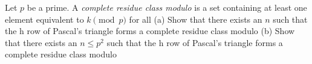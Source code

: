 Let $p$ be a prime. A \textit{complete residue class modulo } is a set containing at least one element equivalent to $k \pmod{p}$ for all 
(a) Show that there exists an $n$ such that the h row of Pascal's triangle forms a complete residue class modulo 
(b) Show that there exists an $n \le p^2$ such that the h row of Pascal's triangle forms a complete residue class modulo 